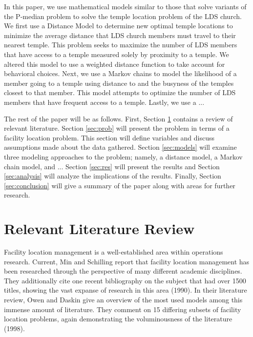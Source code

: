 \documentclass[twoside,twocolumn]{article}
\begin{document}
In this paper, we use mathematical models similar to those that solve variants of the P-median problem to solve the temple location problem of the LDS church.
We first use a Distance Model to determine new optimal temple locations to minimize the average distance that LDS church members must travel to their nearest temple. %
This problem seeks to maximize the number of LDS members that have access to a temple measured solely by proximity to a temple.
We altered this model to use a weighted distance function to take account for behavioral choices.%
Next, we use a Markov chains to model the likelihood of a member going to a temple using distance to and the busyness of the temples closest to that member.
This model attempts to optimize the number of LDS members that have frequent access to a temple. %
Lastly, we use a ... %

The rest of the paper will be as follows.
First, Section \ref{sec:litrev} contains a review of relevant literature.
Section \ref{sec:prob} will present the problem in terms of a facility location problem.
This section will define variables and discuss assumptions made about the data gathered.
Section \ref{sec:models} will examine three modeling approaches to the problem; namely, a distance model, a Markov chain model, and ... %
Section \ref{sec:res} will present the results and Section \ref{sec:analysis} will analyze the implications of the results.
Finally, Section \ref{sec:conclusion} will give a summary of the paper along with areas for further research.

\section{Relevant Literature Review}
\label{sec:litrev}
Facility location management is a well-established area within operations research.
Current, Min and Schilling report that facility location management has been researched through the perspective of many different academic disciplines.
They additionally cite one recent bibliography on the subject that had over 1500 titles, showing the vast expanse of research in this area (1990).
In their literature review, Owen and Daskin give an overview of the most used models among this immense amount of literature. 
They comment on 15 differing subsets of facility location problems, again demonstrating the voluminousness of the literature (1998).
\end{document}
